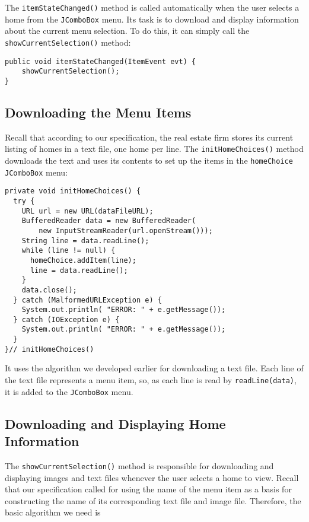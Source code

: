 The {\tt itemStateChanged()} method is called automatically when the
user selects a home from the {\tt JComboBox} menu.  Its task is to
download and display information about the current menu selection.
To do this, it can simply call the {\tt showCurrentSelection()} method:

\begin{jjjlisting}
\begin{lstlisting}
public void itemStateChanged(ItemEvent evt) {
    showCurrentSelection();
}
\end{lstlisting}
\end{jjjlisting}


\subsection*{Downloading the Menu Items}
\noindent Recall that according to our specification, the real estate firm
stores its current listing of homes in a text file, one home per line.
The {\tt initHomeChoices()} method downloads the text and uses its
contents to set up the items in the {\tt homeChoice} {\tt JComboBox}
menu:

\begin{jjjlisting}
\begin{lstlisting}
private void initHomeChoices() {
  try {
    URL url = new URL(dataFileURL);
    BufferedReader data = new BufferedReader(
        new InputStreamReader(url.openStream()));
    String line = data.readLine();
    while (line != null) {
      homeChoice.addItem(line);
      line = data.readLine();
    }
    data.close();
  } catch (MalformedURLException e) {
    System.out.println( "ERROR: " + e.getMessage());
  } catch (IOException e) {
    System.out.println( "ERROR: " + e.getMessage());
  }
}// initHomeChoices()
\end{lstlisting}
\end{jjjlisting}

\noindent It uses the algorithm we developed earlier for downloading
a text file.  Each line of the text file represents a menu item, so, as
each line is read by {\tt readLine(data)}, it is added to the
{\tt JComboBox} menu.

\subsection*{Downloading and Displaying Home Information}
\noindent The {\tt showCurrentSelection()} method is responsible for downloading and
displaying images and text files whenever the user selects a home
to view.  Recall that our specification called for using the name of
the menu item as a basis for constructing the name of its corresponding
text file and image file.   Therefore, the basic algorithm we need is

